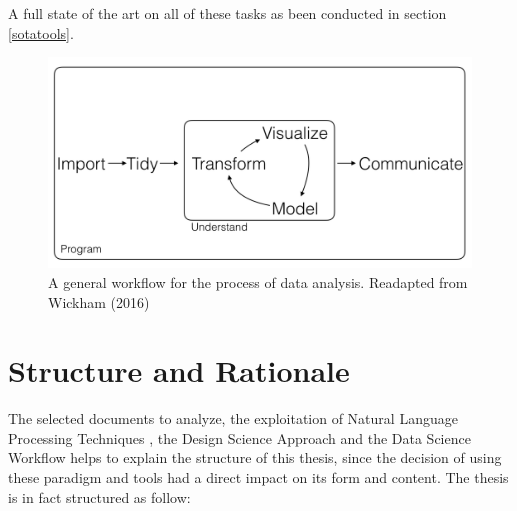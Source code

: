 \documentclass[b5paper,]{book}
\theoremstyle{definition}
\theoremstyle{definition}
\theoremstyle{definition}
\theoremstyle{remark}
\begin{document}
A full state of the art on all of these tasks as been conducted in
section \ref{sotatools}.

\begin{figure}

{\centering \includegraphics[width=0.8\linewidth]{_bookdown_files/figures/main_work_flow} 

}

\caption{A general workflow for the process of data analysis. Readapted from Wickham (2016)}\label{fig:mainworkflow}
\end{figure}

\chapter*{Structure and Rationale}\label{structure-and-rationale}

The selected documents to analyze, the exploitation of Natural Language
Processing Techniques , the Design Science Approach and the Data Science
Workflow helps to explain the structure of this thesis, since the
decision of using these paradigm and tools had a direct impact on its
form and content. The thesis is in fact structured as follow:
\end{document}
